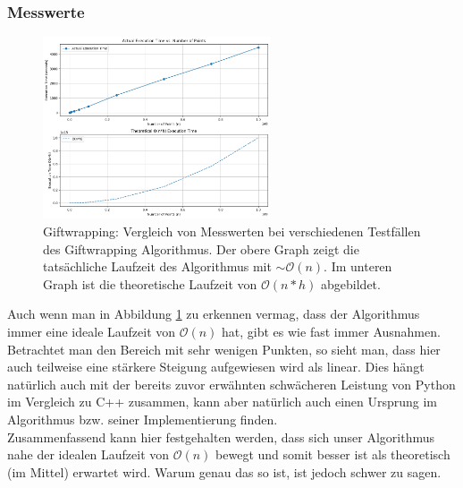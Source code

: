 \documentclass[Labor, MSC, german]{twbook}
\begin{document}
\subsubsection{Messwerte}
\begin{figure}[H]
    \centering
    \includegraphics[width=0.6\textwidth]{./PICs/Giftwrapping.png}
    \caption{Giftwrapping: Vergleich von Messwerten bei verschiedenen Testfällen des Giftwrapping Algorithmus. Der obere Graph zeigt die tatsächliche Laufzeit des Algorithmus mit $\sim\mathcal{O}(n)$. Im unteren Graph ist die theoretische Laufzeit von  $\mathcal{O}(n*h)$ abgebildet.}
    \label{fig:gitwrapping}
\end{figure}

Auch wenn man in Abbildung \ref{fig:gitwrapping} zu erkennen vermag, dass der Algorithmus immer eine ideale Laufzeit von $\mathcal{O}(n)$ hat, gibt es wie fast immer Ausnahmen. Betrachtet man den Bereich mit sehr wenigen Punkten, so sieht man, dass hier auch teilweise eine stärkere Steigung aufgewiesen wird als linear. Dies hängt natürlich auch mit der bereits zuvor erwähnten schwächeren Leistung von Python im Vergleich zu C++ zusammen, kann aber natürlich auch einen Ursprung im Algorithmus bzw. seiner Implementierung finden.\\

Zusammenfassend kann hier festgehalten werden, dass sich unser Algorithmus nahe der idealen Laufzeit von $\mathcal{O}(n)$ bewegt und somit besser ist als theoretisch (im Mittel) erwartet wird. Warum genau das so ist, ist jedoch schwer zu sagen.



\clearpage



\clearpage

\listoffigures
\clearpage
\end{document}
